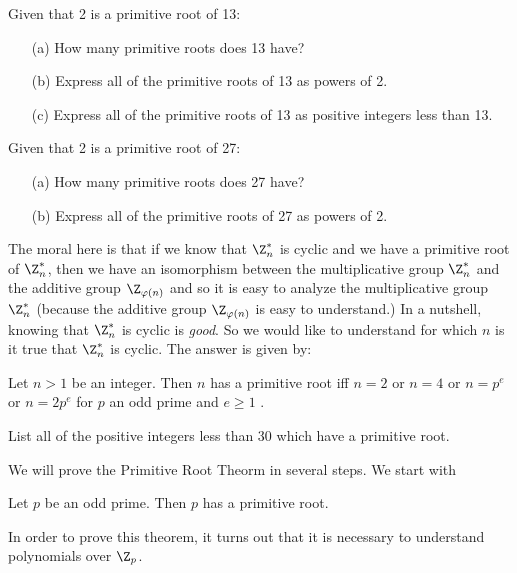 \documentclass[oneside,12pt]{amsart}
\begin{document}
\begin{homework}
Given that 2 is a primitive root of 13:
\begin{enumerate}
\item[{(a)}] How many primitive roots does 13 have?
\item[{(b)}] Express all of the primitive roots of 13 as powers of 2.
\item[{(c)}] Express all of the primitive roots of 13 as positive integers less than 13.
\end{enumerate}
\end{homework}

\begin{homework}
Given that 2 is a primitive root of 27:
\begin{enumerate}
\item[{(a)}] How many primitive roots does 27 have?
\item[{(b)}] Express all of the primitive roots of 27 as powers of 2.
\end{enumerate}
\end{homework}


The moral here is that if we know that $\Z^*_n$ is cyclic and we have a primitive root of 
$\Z^*_n$, then we have an isomorphism between the multiplicative group $\Z^*_n$ and the additive group $\Z_{\varphi(n)}$ and so it is easy to analyze the multiplicative group $\Z^*_n$
(because the additive group $\Z_{\varphi(n)}$ is easy to understand.) In a nutshell, knowing that $\Z^*_n$ is cyclic is \emph{good}. So we would like to understand for which $n$ is
it true that $\Z^*_n$ is cyclic. The answer is given by:

\begin{theorem}
Let $n>1$ be an integer. Then $n$ has a primitive root iff $n=2$ or $n=4$ or $n=p^e$ or $n=2p^e$ for $p$ an odd prime and $e\geq 1$ .
\end{theorem}

\begin{homework}
List all of the positive integers less than 30 which have a primitive root.
\end{homework}

We will prove the Primitive Root Theorm in several steps. We start with

\begin{theorem}
\label{PrimesHavePrimitiveRoots}
Let $p$ be an odd prime. Then $p$ has a primitive root.
\end{theorem}

In order to prove this theorem, it turns out that it is necessary to understand polynomials over $\Z_p$.
\end{document}
